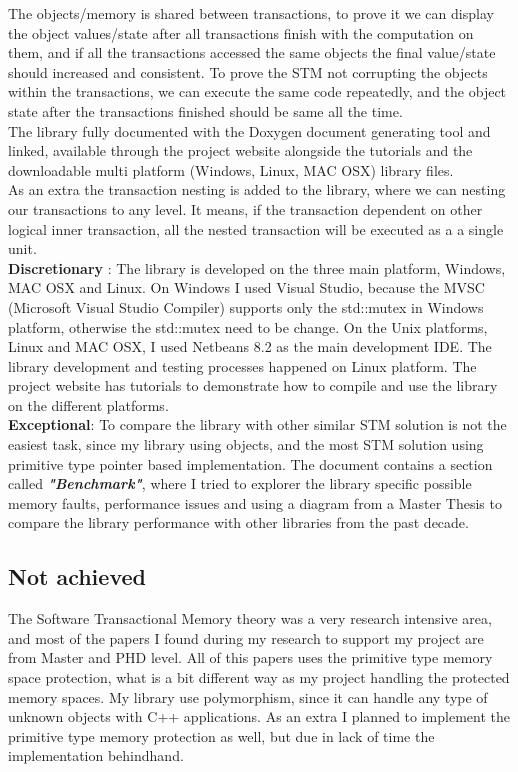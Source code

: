 \documentclass[12pt]{article}
\begin{document}
The objects/memory is shared between transactions, to prove it we can display the object values/state after all transactions finish with the computation on them, and if all the transactions accessed the same objects the final value/state should increased and consistent. To prove the STM not corrupting the objects within the transactions, we can execute the same code repeatedly, and the object state after the transactions finished should be same all the time.\\

The library fully documented with the Doxygen document generating tool and linked, available through the project website alongside the tutorials and the downloadable multi platform (Windows, Linux, MAC OSX) library files.\\

As an extra the transaction nesting is added to the library, where we can nesting our transactions to any level. It means, if the transaction dependent on other logical inner transaction, all the nested transaction will be executed as a a single unit.\\

\textbf{Discretionary} : The library is developed on the three main platform, Windows, MAC OSX and Linux. On Windows I used Visual Studio, because the MVSC (Microsoft Visual Studio Compiler) supports only the std::mutex in Windows platform, otherwise the std::mutex need to be change. On the Unix platforms, Linux and MAC OSX, I used Netbeans 8.2 as the main development IDE. The library development and testing processes happened on Linux platform. The project website has tutorials to demonstrate how to compile and use the library on the different platforms.\\

\textbf{Exceptional}: To compare the library with other similar STM solution is not the easiest task, since my library using objects, and the most STM solution using primitive type pointer based implementation. The document contains a section called \textbf{\textit{"Benchmark"}}, where I tried to explorer the library specific possible memory faults, performance issues and using a diagram from a Master Thesis to compare the library performance with other libraries from the past decade.  

\subsection{Not achieved}
The Software Transactional Memory theory was a very research intensive area, and most of the papers I found during my research to support my project are from Master and PHD level. All of this papers uses the primitive type memory space protection, what is a bit different way as my project handling the protected memory spaces. My library use polymorphism, since it can handle any type of unknown objects with C++ applications. As an extra I planned to implement the primitive type memory protection as well, but due in lack of time the implementation behindhand.\\
\end{document}
